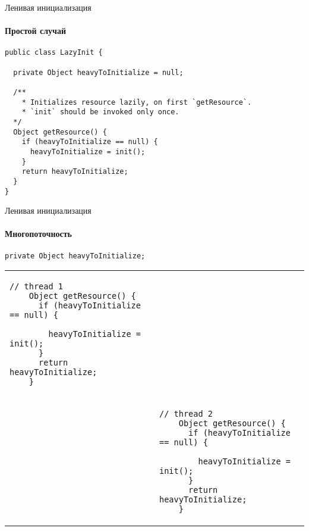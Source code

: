 
\begin{frame}[fragile]{Ленивая инициализация}
\framesubtitle{Простой случай}

\begin{verbatim}
public class LazyInit { 

  private Object heavyToInitialize = null;

  /**
    * Initializes resource lazily, on first `getResource`. 
    * `init` should be invoked only once.
  */
  Object getResource() {
    if (heavyToInitialize == null) {
      heavyToInitialize = init();
    }
    return heavyToInitialize;
  }
}
\end{verbatim}
\end{frame}

\begin{frame}[fragile]{Ленивая инициализация}
\framesubtitle{Многопоточность}

\begin{lstlisting}[basicstyle=\fontsize{8}{8}\selectfont\ttfamily,
    linebackgroundwidth = 17 em
]
    private Object heavyToInitialize;
\end{lstlisting}


\begin{tabular}{p{3.5cm}p{5cm}}

\begin{lstlisting}[basicstyle=\fontsize{8}{8}\selectfont\ttfamily,
    linebackgroundwidth = 20 em,
    linebackgroundcolor={%
      \btLstHL<2-3>{2}
      \btLstHL<4-5>{3}
      \btLstHL<6-7>{4}  
      \btLstHL<8>{5}  
      \btLstHL<9->{7}  
}]
    // thread 1
    Object getResource() {
      if (heavyToInitialize == null) {

        heavyToInitialize = init();
      }
      return heavyToInitialize;
    }
\end{lstlisting}
          &
          \\


          & 
\begin{lstlisting}[basicstyle=\fontsize{8}{8}\selectfont\ttfamily,
    linebackgroundwidth = 22 em,
    linebackgroundcolor={%
      \btLstHLG<3-4>{2}
      \btLstHLG<5-6>{3}
      \btLstHLG<7-9>{4}
      \btLstHLG<10>{5}
      \btLstHLG<11->{7}
}]
    // thread 2
    Object getResource() {
      if (heavyToInitialize == null) {
  
        heavyToInitialize = init();
      }
      return heavyToInitialize;
    }
\end{lstlisting} 
\end{tabular}

\end{frame}

